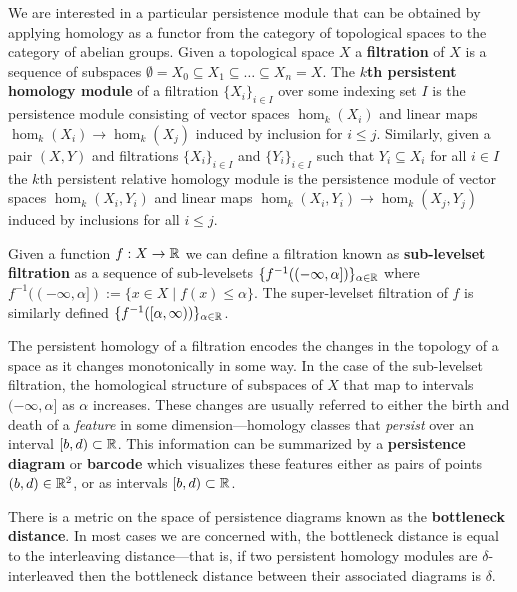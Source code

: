 
We are interested in a particular persistence module that can be obtained by applying homology as a functor from the category of topological spaces to the category of abelian groups.
Given a topological space $X$ a \textbf{filtration} of $X$ is a sequence of subspaces $\emptyset = X_0\subseteq X_1\subseteq\ldots\subseteq X_n = X$.
The \textbf{$k$th persistent homology module} of a filtration $\{X_i\}_{i\in I}$ over some indexing set $I$ is the persistence module consisting of vector spaces $\hom_k(X_i)$ and linear maps $\hom_k(X_i)\to \hom_k(X_j)$ induced by inclusion for $i\leq j$.
Similarly, given a pair $(X,Y)$ and filtrations $\{X_i\}_{i\in I}$ and $\{Y_i\}_{i\in I}$ such that $Y_i\subseteq X_i$ for all $i\in I$ the $k$th persistent relative homology module is the persistence module of vector spaces $\hom_k(X_i, Y_i)$ and linear maps $\hom_k(X_i, Y_i)\to\hom_k(X_j, Y_j)$ induced by inclusions for all $i\leq j$.

Given a function $f: X\to \mathbb{R}$ we can define a filtration known as \textbf{sub-levelset filtration} as a sequence of sub-levelsets $\{f^{-1}((-\infty, \alpha])\}_{\alpha\in\mathbb{R}}$ where $f^{-1}((-\infty, \alpha]) := \{x\in X\mid f(x)\leq\alpha\}$.
The super-levelset filtration of $f$ is similarly defined $\{f^{-1}([\alpha,\infty))\}_{\alpha\in\mathbb{R}}$.

The persistent homology of a filtration encodes the changes in the topology of a space as it changes monotonically in some way.
In the case of the sub-levelset filtration, the homological structure of subspaces of $X$ that map to intervals $(-\infty,\alpha]$ as $\alpha$ increases.
These changes are usually referred to either the birth and death of a \emph{feature} in some dimension---homology classes that \emph{persist} over an interval $[b, d)\subset\mathbb{R}$.
This information can be summarized by a \textbf{persistence diagram} or \textbf{barcode} which visualizes these features either as pairs of points $(b, d)\in\mathbb{R}^2$, or as intervals $[b, d)\subset\mathbb{R}$.

There is a metric on the space of persistence diagrams known as the \textbf{bottleneck distance}.
In most cases we are concerned with, the bottleneck distance is equal to the interleaving distance---that is, if two persistent homology modules are $\delta$-interleaved then the bottleneck distance between their associated diagrams is $\delta$.
